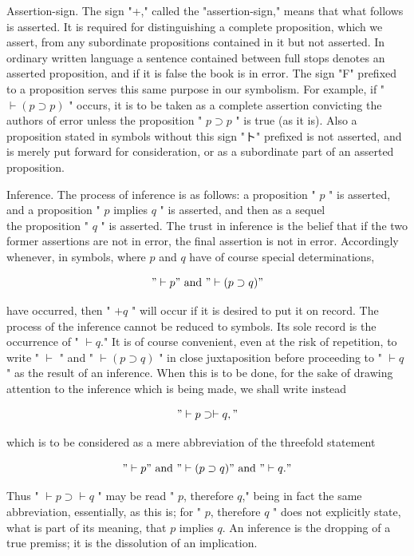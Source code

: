 \documentclass[10pt]{article}
\begin{document}
Assertion-sign. The sign "+," called the "assertion-sign," means that what follows is asserted. It is required for distinguishing a complete proposition, which we assert, from any subordinate propositions contained in it but not asserted. In ordinary written language a sentence contained between full stops denotes an asserted proposition, and if it is false the book is in error. The sign "F" prefixed to a proposition serves this same purpose in our symbolism. For example, if " $\vdash(p \supset p)$ " occurs, it is to be taken as a complete assertion convicting the authors of error unless the proposition " $p \supset p$ " is true (as it is). Also a proposition stated in symbols without this sign "ト" prefixed is not asserted, and is merely put forward for consideration, or as a subordinate part of an asserted proposition.

Inference. The process of inference is as follows: a proposition " $p$ " is asserted, and a proposition " $p$ implies $q$ " is asserted, and then as a sequel\\
the proposition " $q$ " is asserted. The trust in inference is the belief that if the two former assertions are not in error, the final assertion is not in error. Accordingly whenever, in symbols, where $p$ and $q$ have of course special determinations,

$$
" \vdash p " \text { and } " \vdash(p \supset q) "
$$

have occurred, then " $+q$ " will occur if it is desired to put it on record. The process of the inference cannot be reduced to symbols. Its sole record is the occurrence of " $\vdash q$." It is of course convenient, even at the risk of repetition, to write " $\vdash$ " and " $\vdash(p \supset q)$ " in close juxtaposition before proceeding to " $\vdash q$ " as the result of an inference. When this is to be done, for the sake of drawing attention to the inference which is being made, we shall write instead

$$
" \vdash p \supset \vdash q, "
$$

which is to be considered as a mere abbreviation of the threefold statement

$$
" \vdash p " \text { and } " \vdash(p \supset q) " \text { and } " \vdash q . "
$$

Thus " $\vdash p \supset \vdash q$ " may be read " $p$, therefore $q$," being in fact the same abbreviation, essentially, as this is; for " $p$, therefore $q$ " does not explicitly state, what is part of its meaning, that $p$ implies $q$. An inference is the dropping of a true premiss; it is the dissolution of an implication.
\end{document}
